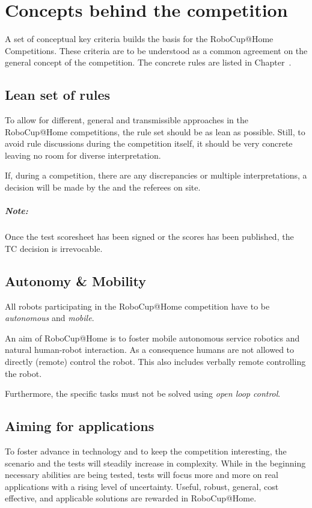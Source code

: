 \chapter{Concepts behind the competition}
\label{chap:concepts}
A set of conceptual key criteria builds the basis for the RoboCup@Home Competitions. These criteria are to be understood as a common agreement on the general concept of the competition. The concrete rules are listed in Chapter~.

\section{Lean set of rules}
\label{concept:lean_set_of_rules}
To allow for different, general and transmissible approaches in the RoboCup@Home competitions, the rule set should be as lean as possible. Still, to avoid rule discussions during the competition itself, it should be very concrete leaving no room for diverse interpretation.

If, during a competition, there are any discrepancies or multiple interpretations, a decision will be made by the  and the referees on site.

\paragraph*{Note: } Once the test scoresheet has been signed or the scores has been published, the TC decision is irrevocable.

\section{Autonomy \& Mobility}
\label{concept:autonomy_and_mobility}
All robots participating in the RoboCup@Home competition have to be \emph{autonomous} and \emph{mobile}.

An aim of RoboCup@Home is to foster mobile autonomous service robotics and natural human-robot interaction. As a consequence humans are not allowed to directly (remote) control the robot. This also includes verbally remote controlling the robot.

Furthermore, the specific tasks must not be solved using \emph{open loop control}.

\section{Aiming for applications}
\label{concept:aiming_for_applications}
To foster advance in technology and to keep the competition interesting, the scenario and the tests will steadily increase in complexity. While in the beginning necessary abilities are being tested, tests will focus more and more on real applications with a rising level of uncertainty. Useful, robust, general, cost effective, and applicable solutions are rewarded in RoboCup@Home.

